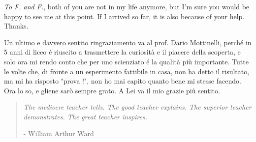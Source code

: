 \textit{To F. and F.}, both of you are not in my life anymore, but I'm sure you would be happy to see me at this point. If I arrived so far, it is also because of your help. Thanks.

Un ultimo e davvero sentito ringraziamento va al prof. Dario Mottinelli, perché in 5 anni di liceo é riuscito a trasmettere la curiosit\`a e il piacere della scoperta, e solo ora mi rendo conto che per uno scienziato é la qualit\`a pi\`u importante. Tutte le volte che, di fronte a un esperimento fattibile in casa, non ha detto il risultato, ma mi ha risposto "prova !", non ho mai capito quanto bene mi stesse facendo. Ora lo so, e gliene sar\`o sempre grato. A Lei va il mio grazie pi\`u sentito.
\blockquote{
\emph{The mediocre teacher tells. The good teacher explains. The superior teacher demonstrates. The great teacher inspires.}
\begin{flushright}
- William Arthur Ward
\end{flushright}
}%
